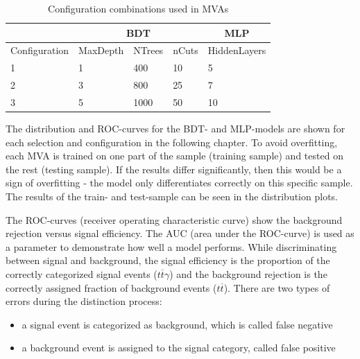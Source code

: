 \documentclass[11pt]{scrartcl}
\begin{document}
	\begin{table}[H]
	\begin{center}
	\begin{tabular}{|l|l|l|l|l|}
	\hline
	              & \multicolumn{3}{c|}{BDT}                         & \multicolumn{1}{c|}{MLP} \\ \hline
	Configuration & MaxDepth & NTrees & nCuts & HiddenLayers         \\ \hline
	1             & 1             & 400             & 10             & 5                        \\ \hline
	2             & 3             & 800             & 25             & 7                        \\ \hline
	3             & 5             & 1000            & 50             & 10                       \\ \hline
	\end{tabular}
		\caption{Configuration combinations used in MVAs}
		\label{tab:config}
	\end{center}
	\end{table}

	
The distribution and ROC-curves for the BDT- and MLP-models are shown for each selection and configuration in the following chapter. To avoid overfitting, each MVA is trained on one part of the sample (training sample) and tested on the rest (testing sample). If the results differ significantly, then this would be a sign of overfitting - the model only differentiates correctly on this specific sample. The results of the train- and test-sample can be seen in the distribution plots.

The ROC-curves (receiver operating characteristic curve) show the background rejection versus signal efficiency. The AUC (area under the ROC-curve) is used as a parameter to demonstrate how well a model performs. While discriminating between signal and background, the signal efficiency is the proportion of the correctly categorized signal events ($t\overline{t}\gamma$) and the background rejection is the correctly assigned fraction of background events ($t\overline{t}$). There are two types of errors during the distinction process:
		\begin{itemize}
  			\item a signal event is categorized as background, which is called false negative
  			\item a background event is assigned to the signal category, called false positive  			
  		\end{itemize}			
  		
\end{document}

